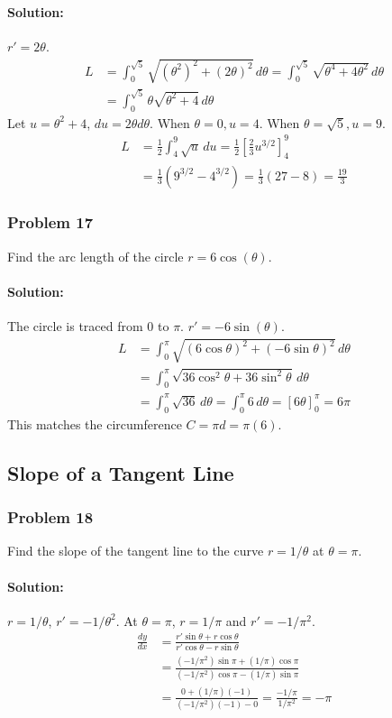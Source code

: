 \documentclass{article}
\begin{document}
\paragraph{Solution:}
$r' = 2\theta$.
\begin{align*} L &= \int_{0}^{\sqrt{5}} \sqrt{(\theta^2)^2 + (2\theta)^2} \,d\theta = \int_{0}^{\sqrt{5}} \sqrt{\theta^4 + 4\theta^2} \,d\theta \\ &= \int_{0}^{\sqrt{5}} \theta\sqrt{\theta^2 + 4} \,d\theta \end{align*}
Let $u = \theta^2+4$, $du=2\theta d\theta$. When $\theta=0, u=4$. When $\theta=\sqrt{5}, u=9$.
\begin{align*} L &= \frac{1}{2} \int_{4}^{9} \sqrt{u} \,du = \frac{1}{2} \left[\frac{2}{3}u^{3/2}\right]_{4}^{9} \\ &= \frac{1}{3} (9^{3/2} - 4^{3/2}) = \frac{1}{3} (27 - 8) = \frac{19}{3} \end{align*}

\subsubsection*{Problem 17}
Find the arc length of the circle $r = 6\cos(\theta)$.
\paragraph{Solution:}
The circle is traced from $0$ to $\pi$. $r' = -6\sin(\theta)$.
\begin{align*} L &= \int_{0}^{\pi} \sqrt{(6\cos\theta)^2 + (-6\sin\theta)^2} \,d\theta \\ &= \int_{0}^{\pi} \sqrt{36\cos^2\theta + 36\sin^2\theta} \,d\theta \\ &= \int_{0}^{\pi} \sqrt{36} \,d\theta = \int_{0}^{\pi} 6 \,d\theta = [6\theta]_{0}^{\pi} = 6\pi \end{align*}
This matches the circumference $C = \pi d = \pi(6)$.


\subsection*{Slope of a Tangent Line}

\subsubsection*{Problem 18}
Find the slope of the tangent line to the curve $r = 1/\theta$ at $\theta = \pi$.
\paragraph{Solution:}
$r = 1/\theta$, $r' = -1/\theta^2$.
At $\theta=\pi$, $r=1/\pi$ and $r'=-1/\pi^2$.
\begin{align*} \frac{dy}{dx} &= \frac{r'\sin\theta + r\cos\theta}{r'\cos\theta - r\sin\theta} \\ &= \frac{(-1/\pi^2)\sin\pi + (1/\pi)\cos\pi}{(-1/\pi^2)\cos\pi - (1/\pi)\sin\pi} \\ &= \frac{0 + (1/\pi)(-1)}{(-1/\pi^2)(-1) - 0} = \frac{-1/\pi}{1/\pi^2} = -\pi \end{align*}
\end{document}
